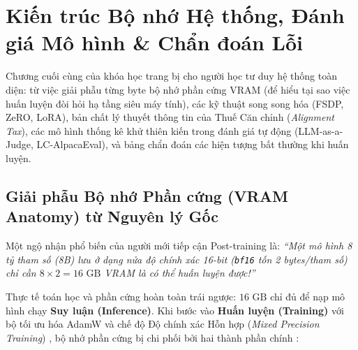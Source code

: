 \chapter{Kiến trúc Bộ nhớ Hệ thống, Đánh giá Mô hình \& Chẩn đoán Lỗi}
\label{chap:systems_evaluation}

\begin{pedagogy}
Chương cuối cùng của khóa học trang bị cho người học tư duy hệ thống toàn diện: từ việc giải phẫu từng byte bộ nhớ phần cứng VRAM (để hiểu tại sao việc huấn luyện đòi hỏi hạ tầng siêu máy tính), các kỹ thuật song song hóa (FSDP, ZeRO, LoRA), bản chất lý thuyết thông tin của Thuế Căn chỉnh (\textit{Alignment Tax}), các mô hình thống kê khử thiên kiến trong đánh giá tự động (LLM-as-a-Judge, LC-AlpacaEval), và bảng chẩn đoán các hiện tượng bất thường khi huấn luyện.
\end{pedagogy}

\section{Giải phẫu Bộ nhớ Phần cứng (VRAM Anatomy) từ Nguyên lý Gốc}
\label{sec:vram_anatomy}

Một ngộ nhận phổ biến của người mới tiếp cận Post-training là: \textit{``Một mô hình 8 tỷ tham số (8B) lưu ở dạng nửa độ chính xác 16-bit (\texttt{bf16} tốn 2 bytes/tham số) chỉ cần $8 \times 2 = 16\text{ GB}$ VRAM là có thể huấn luyện được!''}

Thực tế toán học và phần cứng hoàn toàn trái ngược: $16\text{ GB}$ chỉ đủ để nạp mô hình chạy \textbf{Suy luận (Inference)}. Khi bước vào \textbf{Huấn luyện (Training)} với bộ tối ưu hóa AdamW \citep{loshchilov2019decoupled} và chế độ Độ chính xác Hỗn hợp (\textit{Mixed Precision Training}) \citep{micikevicius2018mixed}, bộ nhớ phần cứng bị chi phối bởi hai thành phần chính \citep{rajbhandari2020zero}:


